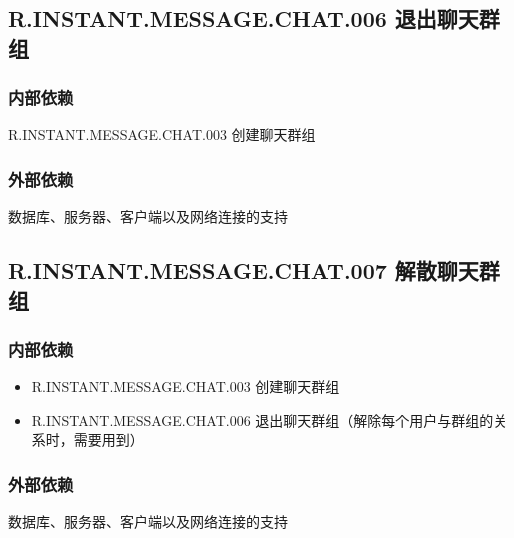 \subsection{R.INSTANT.MESSAGE.CHAT.006 退出聊天群组}
\subsubsection{内部依赖}
    R.INSTANT.MESSAGE.CHAT.003 创建聊天群组
\subsubsection{外部依赖}
    数据库、服务器、客户端以及网络连接的支持

\subsection{R.INSTANT.MESSAGE.CHAT.007 解散聊天群组}
\subsubsection{内部依赖}
\begin{itemize}
    \item R.INSTANT.MESSAGE.CHAT.003 创建聊天群组
    \item R.INSTANT.MESSAGE.CHAT.006 退出聊天群组（解除每个用户与群组的关系时，需要用到）
\end{itemize}
\subsubsection{外部依赖}
    数据库、服务器、客户端以及网络连接的支持
